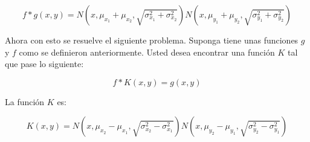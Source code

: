 \documentclass[oneside]{book}
\begin{document}
\begin{equation}
f*g(x,y)   =  N\left(x, \mu_{x_1} +\mu_{x_2}, \sqrt{\sigma_{x_1}^2 + \sigma_{x_2}^2}\right) N\left(x, \mu_{y_1} +\mu_{y_2}, \sqrt{\sigma_{y_1}^2 + \sigma_{y_2}^2}\right)
\end{equation}

Ahora con esto se resuelve el siguiente problema. Suponga tiene unas funciones $g$ y $f$ como se definieron anteriormente. Usted desea encontrar una función $K$ tal que pase lo siguiente:

\begin{equation}
f*K(x,y)   =  g(x,y)
\end{equation}

La función $K$ es:

\begin{equation}
K(x,y)   =  N\left(x, \mu_{x_2} - \mu_{x_1} , \sqrt{ \sigma_{x_2}^2 - \sigma_{x_1}^2}\right) N\left(x,  \mu_{y_2}-\mu_{y_1}, \sqrt{  \sigma_{y_2}^2  - \sigma_{y_1}^2}\right)
\end{equation}
\end{document}
